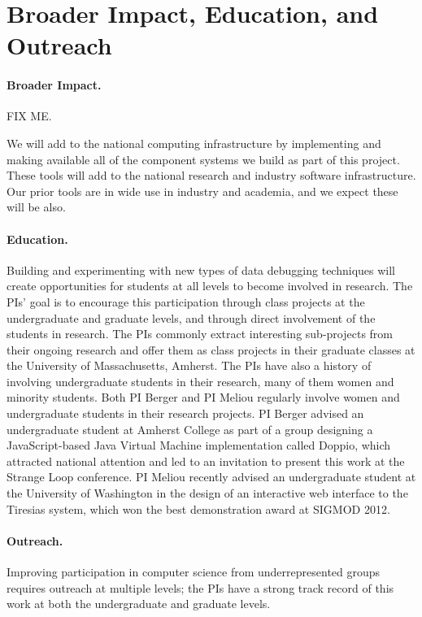 \section{Broader Impact, Education, and Outreach}
\label{sec:impact}

\paragraph{Broader Impact.} 
FIX ME.

We will add to the national computing infrastructure by implementing
and making available all of the component
systems we build as part of this project.  These tools will add to the national research and industry
software infrastructure. Our prior tools are in wide use in industry
and academia, and we expect these will be also.

\paragraph{Education.}

Building and experimenting with new types of data debugging techniques
will create opportunities for students at all levels to become
involved in research. The PIs' goal is to encourage this participation
through class projects at the undergraduate and graduate levels, and
through direct involvement of the students in research. The PIs
commonly extract interesting sub-projects from their ongoing research
and offer them as class projects in their graduate classes at the
University of Massachusetts, Amherst. The PIs have also a history of
involving undergraduate students in their research, many of them women
and minority students. Both PI Berger and PI Meliou regularly involve
women and undergraduate students in their research projects. PI Berger
advised an undergraduate student at Amherst College as part of a group
designing a JavaScript-based Java Virtual Machine implementation
called Doppio, which attracted national attention and led to an
invitation to present this work at the Strange Loop conference.  PI
Meliou recently advised an undergraduate student at the University of
Washington in the design of an interactive web interface to the
Tiresias system, which won the best demonstration award at SIGMOD
2012.


\paragraph{Outreach.}
Improving participation in computer science from underrepresented groups
requires outreach at multiple levels; the PIs have a strong track record
of this work at both the undergraduate and graduate levels.


